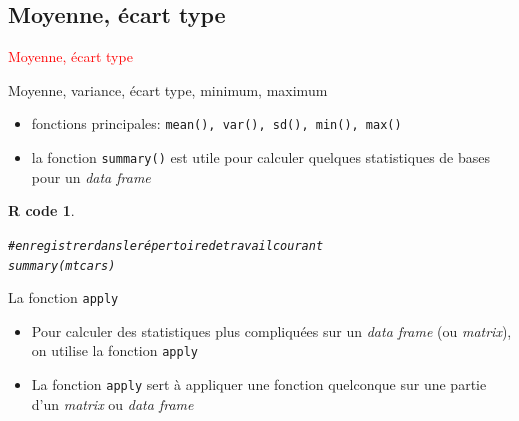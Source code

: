 \documentclass[11pt]{beamer}\usepackage[]{graphicx}\usepackage[]{color}
\makeatletter
\newcommand{\hlcom}[1]{\textcolor[rgb]{0.588,0.588,0.588}{#1}}%
\newcommand{\hlstd}[1]{\textcolor[rgb]{0.196,0.196,0.196}{#1}}%
\newcommand{\hlkwd}[1]{\textcolor[rgb]{0.78,0.227,0.412}{#1}}%
\newenvironment{kframe}{%
 \def\at@end@of@kframe{}%
 \ifinner\ifhmode%
  \def\at@end@of@kframe{\end{minipage}}%
  \begin{minipage}{\columnwidth}%
 \fi\fi%
 \def\FrameCommand##1{\hskip\@totalleftmargin \hskip-\fboxsep
 \colorbox{shadecolor}{##1}\hskip-\fboxsep
     \hskip-\linewidth \hskip-\@totalleftmargin \hskip\columnwidth}%
 \MakeFramed {\advance\hsize-\width
   \@totalleftmargin\z@ \linewidth\hsize
   \@setminipage}}%
 {\par\unskip\endMakeFramed%
 \at@end@of@kframe}
\newenvironment{knitrout}{}{} %
\newtheorem{rcode}{R code}[section]
\newcommand{\code}[1]{\texttt{#1}}
\makeatother
\begin{document}

\subsection{Moyenne, écart type}

\begin{frame}
 \begin{center}
  \Huge{\textcolor{red}{Moyenne, écart type}}
 \end{center}
\end{frame}



\begin{frame}[fragile]{Moyenne, variance, écart type, minimum, maximum}

\begin{itemize}
  \setlength\itemsep{2em}
\item fonctions principales: \code{mean(), var(), sd(), min(), max()}
\pause \item la fonction \code{summary()} est utile pour calculer quelques statistiques de bases pour un \textit{data frame}
\end{itemize}
\pause 
\begin{knitrout}
\color{fgcolor}\begin{kframe}
\begin{rcode}\label{unnamed-chunk-36}\begin{alltt}
\hlcom{# enregistrer dans le répertoire de travail courant}
\hlkwd{summary}\hlstd{(mtcars)}
\end{alltt}
\end{rcode}\end{kframe}
\end{knitrout}
\end{frame}




\begin{frame}[fragile]{La fonction \code{apply}}
\begin{itemize}
  \setlength\itemsep{1em}
\item Pour calculer des statistiques plus compliquées sur un \textit{data frame} (ou \textit{matrix}), on utilise la fonction \code{apply}
\pause \item La fonction \code{apply} sert à appliquer une fonction quelconque sur une partie d'un \textit{matrix} ou \textit{data frame}
\end{itemize}


\end{frame}
\end{document}

